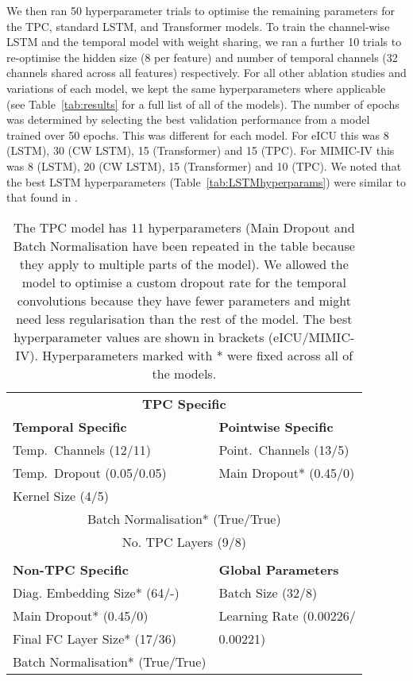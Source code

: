 \documentclass[sigconf]{acmart}
\begin{document}
We then ran 50 hyperparameter trials to optimise the remaining parameters for the TPC, standard LSTM, and Transformer models. To train the channel-wise LSTM and the temporal model with weight sharing, we ran a further 10 trials to re-optimise the hidden size (8 per feature) and number of temporal channels (32 channels shared across all features) respectively. For all other ablation studies and variations of each model, we kept the same hyperparameters where applicable (see Table~\ref{tab:results} for a full list of all of the models). The number of epochs was determined by selecting the best validation performance from a model trained over 50 epochs. This was different for each model. For eICU this was 8 (LSTM), 30 (CW LSTM), 15 (Transformer) and 15 (TPC). For MIMIC-IV this was 8 (LSTM), 20 (CW LSTM), 15 (Transformer) and 10 (TPC). We noted that the best LSTM hyperparameters (Table~\ref{tab:LSTMhyperparams}) were similar to that found in \citet{sheikhalishahi2019benchmarking}. 

\begin{table}
  \caption{The TPC model has 11 hyperparameters (Main Dropout and Batch Normalisation have been repeated in the table because they apply to multiple parts of the model). We allowed the model to optimise a custom dropout rate for the temporal convolutions because they have fewer parameters and might need less regularisation than the rest of the model. The best hyperparameter values are shown in brackets (eICU/MIMIC-IV). Hyperparameters marked with * were fixed across all of the models.}
  \label{tab:TPChyperparams}
  \centering
  \begin{tabular}{ll}
    \toprule
    \multicolumn{2}{c}{\textbf{TPC Specific}}\\
    \textbf{Temporal Specific} & \textbf{Pointwise Specific}\\
    \midrule
    Temp.\ Channels (12/11)&Point.\ Channels (13/5)\\
    Temp.\ Dropout (0.05/0.05)&Main Dropout* (0.45/0)\\
    Kernel Size (4/5)& \\
    \multicolumn{2}{c}{Batch Normalisation* (True/True)}\\
    \multicolumn{2}{c}{No. TPC Layers (9/8)}\\
    \vspace{-0.8em}\\
    \toprule
    \textbf{Non-TPC Specific} & \textbf{Global Parameters}\\
    \midrule
    Diag. Embedding Size* (64/-)&Batch Size (32/8)\\
    Main Dropout* (0.45/0)&Learning Rate (0.00226/\\
    Final FC Layer Size* (17/36)&0.00221)\\
    Batch Normalisation* (True/True)&\\
    \bottomrule
  \end{tabular}
\end{table}
\end{document}
